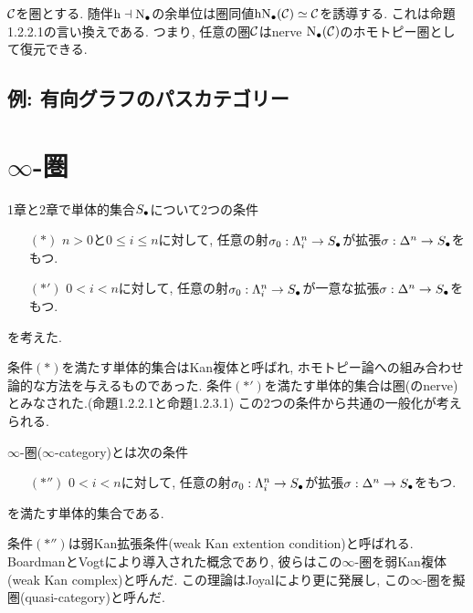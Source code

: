 \documentclass[uplatex, a4paper, 14Q, dvipdfmx]{jsreport}
\begin{document}
\begin{remark}
  $\calC$を圏とする. 
  随伴$\h \dav \N$の余単位は圏同値$\h \N(\calC) \simeq \calC$を誘導する. 
  これは命題1.2.2.1の言い換えである. 
  つまり, 任意の圏$\calC$はnerve $\N(\calC)$のホモトピー圏として復元できる. 
\end{remark}

\begin{remark}
  
\end{remark}

\subsection{例: 有向グラフのパスカテゴリー}

\newpage

\section{\texorpdfstring{$\infty$}{infty}-圏}

1章と2章で単体的集合$\S$について2つの条件
\begin{itemize}
  \item[$(\ast)$] $n>0$と$0 \leq i \leq n$に対して, 任意の射$\si_0: \Lambda^n_i \to \S$が拡張$\si: \Delta^n \to \S$をもつ.
  \item[$(\ast')$] $0<i<n$に対して, 任意の射$\si_0: \Lambda^n_i \to \S$が一意な拡張$\si: \Delta^n \to \S$をもつ. 
\end{itemize}
を考えた. 

条件$(\ast)$を満たす単体的集合はKan複体と呼ばれ, ホモトピー論への組み合わせ論的な方法を与えるものであった.
条件$(\ast')$を満たす単体的集合は圏(のnerve)とみなされた.(命題1.2.2.1と命題1.2.3.1)
この2つの条件から共通の一般化が考えられる. 

\begin{definition}
  $\infty$-圏($\infty$-category)とは次の条件
  \begin{itemize}
    \item[$(\ast'')$] $0<i<n$に対して, 任意の射$\si_0: \Lambda^n_i \to \S$が拡張$\si: \Delta^n \to \S$をもつ.
  \end{itemize}
  を満たす単体的集合である. 
\end{definition}

\begin{remark}
  条件$(\ast'')$は弱Kan拡張条件(weak Kan extention condition)と呼ばれる. 
  BoardmanとVogtにより導入された概念であり, 彼らはこの$\infty$-圏を弱Kan複体(weak Kan complex)と呼んだ. 
  この理論はJoyalにより更に発展し, この$\infty$-圏を擬圏(quasi-category)と呼んだ. 
\end{remark}
\end{document}

